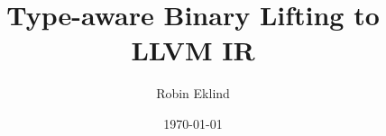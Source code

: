 \documentclass{kththesis}
\title{Type-aware Binary Lifting to LLVM IR}
\author{Robin Eklind}
\date{\today}
\begin{document}


\frontmatter


\titlepage




\clearpage


%


\tableofcontents



%
%
%


\mainmatter










\tailmatter
\end{document}
